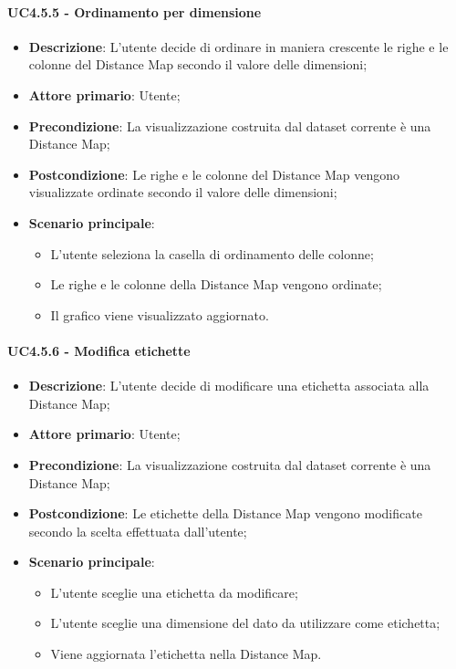 \paragraph{UC4.5.5 - Ordinamento per dimensione}
\label{par:uc4.5.5}
\begin{itemize}
    \item \textbf{Descrizione}: L'utente decide di ordinare in maniera crescente le righe e le colonne del Distance Map secondo il valore delle dimensioni;
    \item \textbf{Attore primario}: Utente;
    \item \textbf{Precondizione}: La visualizzazione costruita dal dataset corrente è una Distance Map;
    \item \textbf{Postcondizione}: Le righe e le colonne del Distance Map vengono visualizzate ordinate secondo il valore delle dimensioni;
    \item \textbf{Scenario principale}:
    \begin{itemize}
        \item L'utente seleziona la casella di ordinamento delle colonne;
        \item Le righe e le colonne della Distance Map vengono ordinate;
        \item Il grafico viene visualizzato aggiornato.
    \end{itemize}
\end{itemize}


\paragraph{UC4.5.6 - Modifica etichette}
\label{par:uc4.5.6}
\begin{itemize}
    \item \textbf{Descrizione}: L'utente decide di modificare una etichetta associata alla Distance Map;
    \item \textbf{Attore primario}: Utente;
    \item \textbf{Precondizione}: La visualizzazione costruita dal dataset corrente è una Distance Map;
    \item \textbf{Postcondizione}: Le etichette della Distance Map vengono modificate secondo la scelta effettuata dall'utente;
    \item \textbf{Scenario principale}:
    \begin{itemize}
        \item L'utente sceglie una etichetta da modificare;
        \item L'utente sceglie una dimensione del dato da utilizzare come etichetta;
        \item Viene aggiornata l'etichetta nella Distance Map.
    \end{itemize}
\end{itemize}


